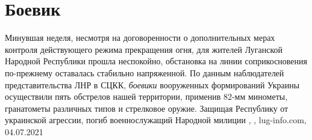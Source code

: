  
 
 
 
 
\chapter{Боевик}
\label{sec:slova.bojevik}

Минувшая неделя, несмотря на договоренности о дополнительных мерах контроля
действующего режима прекращения огня, для жителей Луганской Народной Республики
прошла неспокойно, обстановка на линии соприкосновения по-прежнему оставалась
стабильно напряженной.  По данным наблюдателей представительства ЛНР в СЦКК,
\emph{боевики} вооруженных формирований Украины осуществили пять обстрелов нашей
территории, применив 82-мм минометы, гранатометы различных типов и стрелковое
оружие.  Защищая Республику от украинской агрессии, погиб военнослужащий
Народной милиции
, , lug-info.com, 04.07.2021
